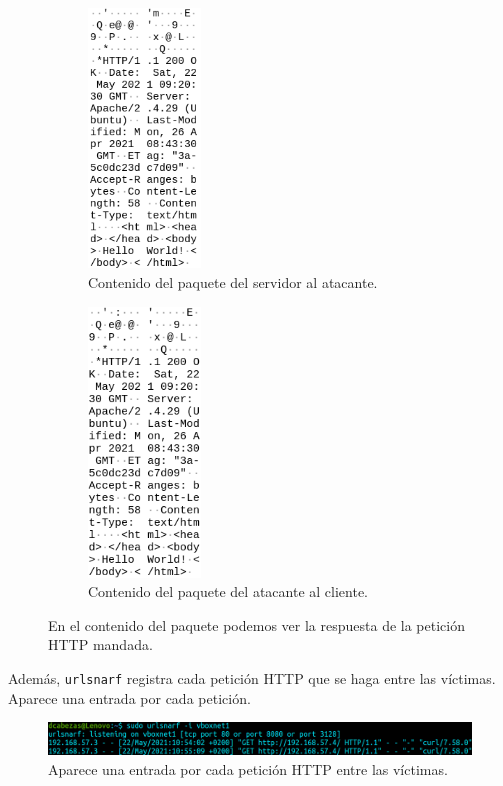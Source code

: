 \documentclass[11pt]{article}
\begin{document}
\begin{figure}[H]
	\centering
	\begin{subfigure}{0.45\textwidth}
		\centering
		\includegraphics[width=30mm]{images/atack1/server-atacker}
		\captionsetup{width=0.5\linewidth}
		\caption{Contenido del paquete del servidor al atacante.}
	\end{subfigure}
	\hspace{-20mm}
	\begin{subfigure}{0.45\textwidth}
		\centering
		\includegraphics[width=30mm]{images/atack1/atacker-client}
		\captionsetup{width=0.5\linewidth}
		\caption{Contenido del paquete del atacante al cliente.}
	\end{subfigure}
	\caption{En el contenido del paquete podemos ver la respuesta de la petición HTTP mandada.}
\end{figure}

Además, \texttt{urlsnarf} registra cada petición HTTP que se haga entre las víctimas. Aparece una entrada por cada petición.

\begin{figure}[H]
	\centering
	\includegraphics[width=160mm]{images/atack1/urlsnarf}
	\caption{Aparece una entrada por cada petición HTTP entre las víctimas.}
	\label{fig:urlsnarf}
\end{figure}
\end{document}
